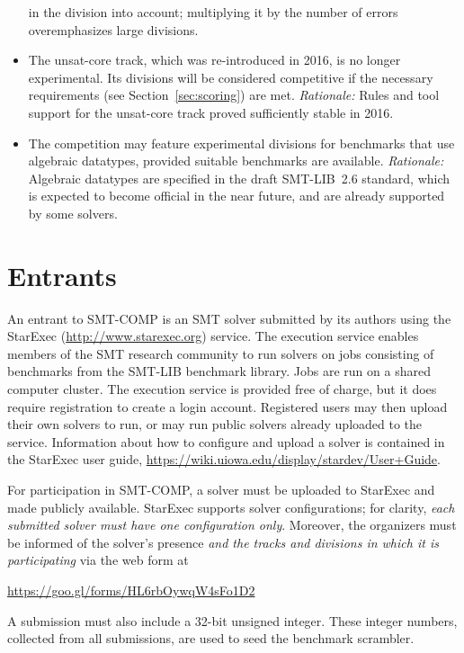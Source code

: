 \documentclass[12pt]{article}
\begin{document}
\begin{itemize}
  in the division into account; multiplying it by the number of errors
  overemphasizes large divisions.
\item The unsat-core track, which was re-introduced in 2016, is no
  longer experimental.  Its divisions will be considered competitive
  if the necessary requirements (see Section~\ref{sec:scoring}) are
  met.  \emph{Rationale:} Rules and tool support for the unsat-core
  track proved sufficiently stable in 2016.
\item The competition may feature experimental divisions for
  benchmarks that use algebraic datatypes, provided suitable
  benchmarks are available.  \emph{Rationale:} Algebraic datatypes are
  specified in the draft SMT-LIB~2.6 standard, which is expected to
  become official in the near future, and are already supported by
  some solvers.
\end{itemize}


\section{Entrants}
\label{sec:entrants}

%
An entrant to SMT-COMP is an SMT solver submitted by its authors using
the StarExec (\url{http://www.starexec.org}) service.  The execution
service enables members of the SMT research community to run solvers
on jobs consisting of benchmarks from the SMT-LIB benchmark library.
Jobs are run on a shared computer cluster.  The execution service is
provided free of charge, but it does require registration to create a
login account.  Registered users may then upload their own solvers to
run, or may run public solvers already uploaded to the service.
Information about how to configure and upload a solver is contained in
the StarExec user guide,
\url{https://wiki.uiowa.edu/display/stardev/User+Guide}.

For participation in SMT-COMP, a solver must be uploaded to StarExec
and made publicly available.  StarExec supports solver configurations;
for clarity, \emph{each submitted solver must have one configuration
  only}.  Moreover, the organizers must be informed of the solver's
presence \emph{and the tracks and divisions in which it is
  participating} via the web form at
\begin{center}
  \url{https://goo.gl/forms/HL6rbOywqW4sFo1D2}
\end{center}
A submission must also include a 32-bit unsigned integer.  These
integer numbers, collected from all submissions, are used to seed the
benchmark scrambler.
\end{document}
